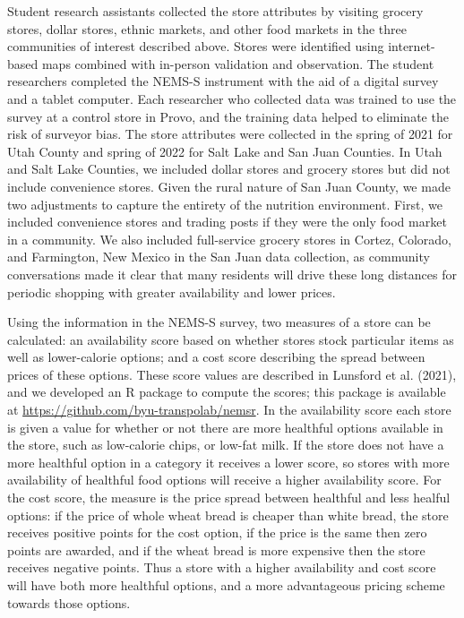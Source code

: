 \documentclass[
  letterpaper,
  authoryear,
  review,
  3p]{elsarticle}
\begin{document}
Student research assistants collected the store attributes by visiting
grocery stores, dollar stores, ethnic markets, and other food markets in
the three communities of interest described above. Stores were
identified using internet-based maps combined with in-person validation
and observation. The student researchers completed the NEMS-S instrument
with the aid of a digital survey and a tablet computer. Each researcher
who collected data was trained to use the survey at a control store in
Provo, and the training data helped to eliminate the risk of surveyor
bias. The store attributes were collected in the spring of 2021 for Utah
County and spring of 2022 for Salt Lake and San Juan Counties. In Utah
and Salt Lake Counties, we included dollar stores and grocery stores but
did not include convenience stores. Given the rural nature of San Juan
County, we made two adjustments to capture the entirety of the nutrition
environment. First, we included convenience stores and trading posts if
they were the only food market in a community. We also included
full-service grocery stores in Cortez, Colorado, and Farmington, New
Mexico in the San Juan data collection, as community conversations made
it clear that many residents will drive these long distances for
periodic shopping with greater availability and lower prices.

Using the information in the NEMS-S survey, two measures of a store can
be calculated: an availability score based on whether stores stock
particular items as well as lower-calorie options; and a cost score
describing the spread between prices of these options. These score
values are described in Lunsford et al. (2021), and we developed an R
package to compute the scores; this package is available at
\url{https://github.com/byu-transpolab/nemsr}. In the availability score
each store is given a value for whether or not there are more healthful
options available in the store, such as low-calorie chips, or low-fat
milk. If the store does not have a more healthful option in a category
it receives a lower score, so stores with more availability of healthful
food options will receive a higher availability score. For the cost
score, the measure is the price spread between healthful and less
healful options: if the price of whole wheat bread is cheaper than white
bread, the store receives positive points for the cost option, if the
price is the same then zero points are awarded, and if the wheat bread
is more expensive then the store receives negative points. Thus a store
with a higher availability and cost score will have both more healthful
options, and a more advantageous pricing scheme towards those options.
\end{document}
